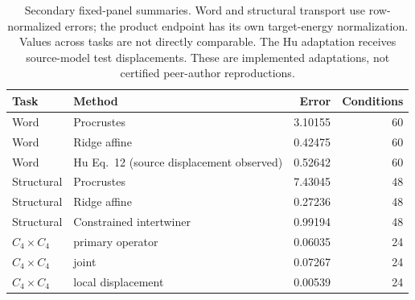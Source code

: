 \begin{table}[htbp]\centering\small
\begin{tabular}{llrr}\toprule
Task & Method & Error & Conditions \\
\midrule
Word & Procrustes & 3.10155 & 60 \\
Word & Ridge affine & 0.42475 & 60 \\
Word & Hu Eq.~12 (source displacement observed) & 0.52642 & 60 \\
Structural & Procrustes & 7.43045 & 48 \\
Structural & Ridge affine & 0.27236 & 48 \\
Structural & Constrained intertwiner & 0.99194 & 48 \\
$C_4\times C_4$ & primary operator & 0.06035 & 24 \\
$C_4\times C_4$ & joint & 0.07267 & 24 \\
$C_4\times C_4$ & local displacement & 0.00539 & 24 \\
\bottomrule\end{tabular}
\caption{Secondary fixed-panel summaries. Word and structural transport use row-normalized errors; the product endpoint has its own target-energy normalization. Values across tasks are not directly comparable. The Hu adaptation receives source-model test displacements. These are implemented adaptations, not certified peer-author reproductions.}
\label{tab:reproduction-secondary}\end{table}
